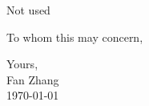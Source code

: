 \documentclass[11pt]{letter}
\begin{document}
\begin{letter}{Not used}

\opening{To whom this may concern,}

\lipsum[3-5]

Yours, \\[10mm]
Fan Zhang \\
\today

\end{letter}
\end{document}
